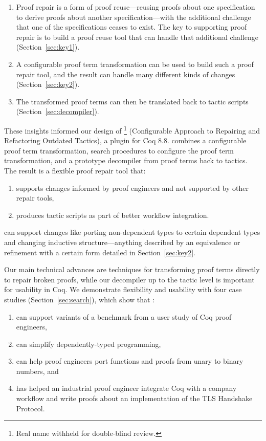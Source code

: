 \begin{enumerate}
\item Proof repair is a form of proof reuse---reusing proofs about one specification to derive proofs about another specification---with 
the additional challenge that one of the specifications ceases to exist.
The key to supporting proof repair is to build a proof reuse
tool that can handle that additional challenge (Section~\ref{sec:key1}). 
\item A configurable proof term transformation can be used to build such a proof repair tool,
and the result can handle many different kinds of changes (Section~\ref{sec:key2}).
\item The transformed proof terms can then be translated back to tactic scripts (Section~\ref{sec:decompiler}).
\end{enumerate}

These insights informed our design of 
\toolname\footnote{Real name withheld for double-blind review.} (Configurable Approach to Repairing and Refactoring Outdated Tactics), a plugin for Coq 8.8.
\toolname combines a configurable proof term transformation,
search procedures to configure the proof term transformation,
and a prototype decompiler from proof terms back to tactics.
The result is a flexible proof repair tool that: 

\begin{enumerate}
\item supports changes informed by proof engineers and not supported by other repair tools,
\item produces tactic scripts as part of better workflow integration.
\end{enumerate}
\toolname can support changes like porting non-dependent types to certain dependent types
and changing inductive structure---anything described by an equivalence or refinement with a certain form
detailed in Section~\ref{sec:key2}.

Our main technical advances are techniques for transforming proof terms directly to repair broken proofs, while our decompiler up to the tactic level is important for usability in Coq.
We demonstrate flexibility and usability with four case studies (Section~\ref{sec:search}), which show that \toolname:

\begin{enumerate}
\item can support variants of a benchmark from a user study of Coq proof engineers,
\item can simplify dependently-typed programming, %
\item can help proof engineers port functions and proofs from unary to binary numbers, and
\item has helped an industrial proof engineer integrate Coq with a company workflow and write proofs about an implementation of the TLS Handshake Protocol.
\end{enumerate}

